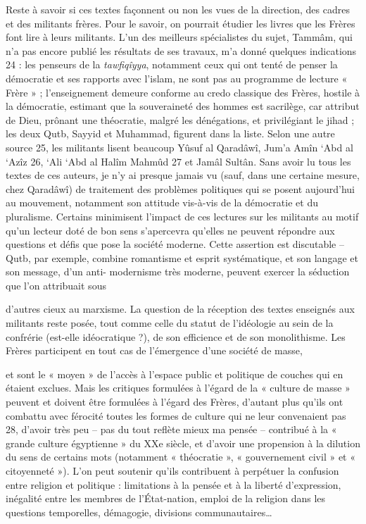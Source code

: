 Reste à savoir si ces textes façonnent ou non les vues de la direction,
des cadres et des militants frères. Pour le savoir, on pourrait étudier
les livres que les Frères font lire à leurs militants. L'un des
meilleurs spécialistes du sujet, Tammâm, qui n'a pas encore publié les
résultats de ses travaux, m'a donné quelques indications 24 : les
penseurs de la \emph{tawfiqîyya}, notamment ceux qui ont tenté de penser
la démocratie et ses rapports avec l'islam, ne sont pas au programme de
lecture « Frère » ; l'enseignement demeure conforme au credo classique
des Frères, hostile à la démocratie, estimant que la souveraineté des
hommes est sacrilège, car attribut de Dieu, prônant une théocratie,
malgré les dénégations, et privilégiant le jihad ; les deux Qutb, Sayyid
et Muhammad, figurent dans la liste. Selon une autre source 25, les
militants lisent beaucoup Yûsuf al Qaradâwî, Jum'a Amîn `Abd al `Azîz
26, `Ali `Abd al Halîm Mahmûd 27 et Jamâl Sultân. Sans avoir lu tous les
textes de ces auteurs, je n'y ai presque jamais vu (sauf, dans une
certaine mesure, chez Qaradâwî) de traitement des problèmes politiques
qui se posent aujourd'hui au mouvement, notamment son attitude vis-à-vis
de la démocratie et du pluralisme. Certains minimisent l'impact de ces
lectures sur les militants au motif qu'un lecteur doté de bon sens
s'apercevra qu'elles ne peuvent répondre aux questions et défis que pose
la société moderne. Cette assertion est discutable -- Qutb, par exemple,
combine romantisme et esprit systématique, et son langage et son
message, d'un anti- modernisme très moderne, peuvent exercer la
séduction que l'on attribuait sous

d'autres cieux au marxisme. La question de la réception des textes
enseignés aux militants reste posée, tout comme celle du statut de
l'idéologie au sein de la confrérie (est-elle idéocratique ?), de son
efficience et de son monolithisme. Les Frères participent en tout cas de
l'émergence d'une société de masse,

et sont le « moyen » de l'accès à l'espace public et politique de
couches qui en étaient exclues. Mais les critiques formulées à l'égard
de la « culture de masse » peuvent et doivent être formulées à l'égard
des Frères, d'autant plus qu'ils ont combattu avec férocité toutes les
formes de culture qui ne leur convenaient pas 28, d'avoir très peu --
pas du tout reflète mieux ma pensée -- contribué à la « grande culture
égyptienne » du XXe siècle, et d'avoir une propension à la dilution du
sens de certains mots (notamment « théocratie », « gouvernement civil »
et « citoyenneté »). L'on peut soutenir qu'ils contribuent à perpétuer
la confusion entre religion et politique : limitations à la pensée et à
la liberté d'expression, inégalité entre les membres de l'État-nation,
emploi de la religion dans les questions temporelles, démagogie,
divisions communautaires\ldots{}


